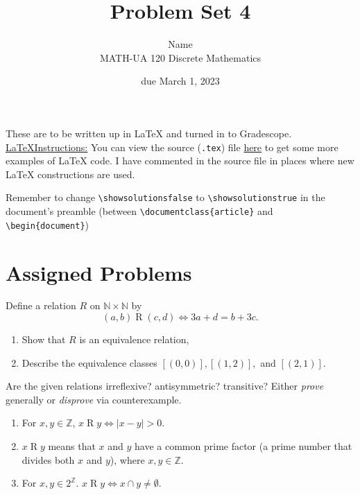 \documentclass{article}
\title{Problem Set 4}
\author{%
    Name
\\  MATH-UA 120 Discrete Mathematics
}
\date{due March 1, 2023}
\newif\ifshowsolutions
\newcommand{\danger}{\marginpar[\hfill\dbend]{\dbend\hfill}}
\newcommand{\Z}{\mathbb{Z}}
\theoremstyle{definition}
\begin{document}
\maketitle



These are to be written up in \LaTeX{} and turned in to Gradescope.\\



\ifshowsolutions
    \SetupExSheets{solution/print=true}
\else
    \danger
 \underline{ \LaTeX  Instructions:}  You can view the source (\texttt{.tex}) file \href{https://bit.ly/3SX4VT4}{here} to get some more examples of \LaTeX{} code.  I have commented in the source file in places where new \LaTeX{} constructions are used.
  
  Remember to change \verb|\showsolutionsfalse| to \verb|\showsolutionstrue|
    in the document's preamble 
    (between \verb|\documentclass{article}| and \verb|\begin{document}|)
\fi

\section*{Assigned Problems}


\begin{question}{7}
    Define a relation $R$ on $\mathbb{N}\times \mathbb{N}$ by
	\[
	(a, b)\mathrel{R}(c, d) \iff 3a+d = b+3c.
	\]
	\begin{enumerate}
	\item Show that $R$ is an equivalence relation, 
	\item Describe the equivalence classes $[(0, 0)], [(1, 2)],$ and $[(2, 1)]$.
	\end{enumerate}
\end{question}
\begin{solution}
\end{solution}


\begin{question}{9}
    Are the given relations irreflexive? antisymmetric? transitive? Either \textit{prove} generally or \textit{disprove} via 
    counterexample.
    	\begin{enumerate}
	\item For $x, y \in \Z$,  $x\mathrel{R}y \iff |x - y| > 0$. 
	\item  $x\mathrel{R}y$ means that $x$ and $y$ have a common prime factor (a prime number that divides both $x$ and $y$), 
	where $x, y \in \Z$.
	\item For $x, y \in 2^{\Z}$. $x\mathrel{R}y \iff x \cap y \neq \emptyset$.
	\end{enumerate}
\end{question}
\begin{solution}
\end{solution}
\end{document}
